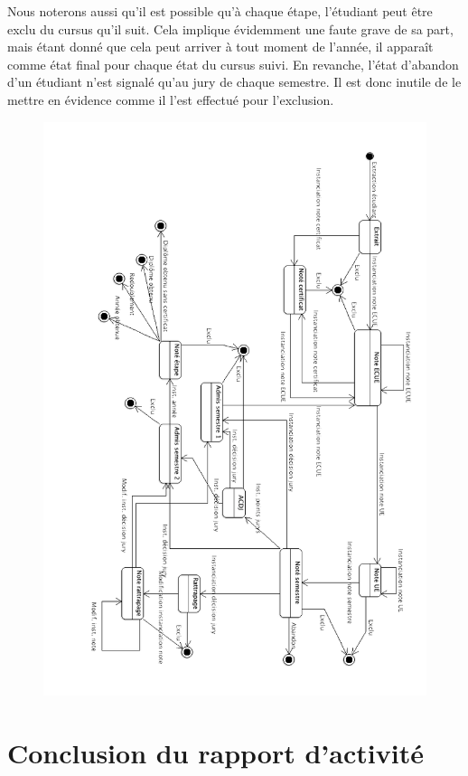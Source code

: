 \documentclass[letter, 11pt] {article}
\begin{document}
	Nous noterons aussi qu'il est possible qu'à chaque étape, l'étudiant peut être exclu du cursus qu'il suit. Cela implique évidemment une faute grave de sa part, mais étant donné que cela peut arriver à tout moment de l'année, il apparaît comme état final pour chaque état du cursus suivi.
	En revanche, l'état d'abandon d'un étudiant n'est signalé qu'au jury de chaque semestre. Il est donc inutile de le mettre en évidence comme il l'est effectué pour l'exclusion.
	
	\begin{figure}[htbp]
			\includegraphics[scale = 0.6]{../Diagramme_machine_etat/Machine_etat.png}
	\end{figure}
	
	\newpage
	
	\section{Conclusion du rapport d'activité}
	
\end{document}
